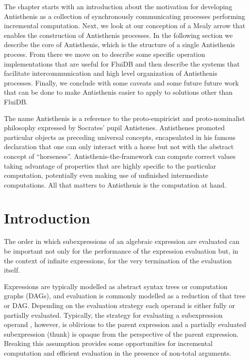 The chapter starts with an introduction about the motivation for
developing Antisthenis as a collection of synchronously communicating
processes performing incremental computation. Next, we look at our
conception of a Mealy arrow that enables the construction of
Antisthenis processes. In the following section we describe the core
of Antisthenis, which is the structure of a single Antisthenis
process. From there we move on to describe some specific operation
implementations that are useful for FluiDB and then describe the
systems that facilitate intercommunication and high level organization
of Antisthenis processes. Finally, we conclude with some caveats and
some future future work that can be done to make Antisthenis easier to
apply to solutions other than FluiDB.

The name Antisthenis is a reference to the proto-empiricist
and proto-nominalist philosophy expressed by Socrates'
pupil Antistenes. Antisthenes promoted particular objects as
preceding universal concepts, encapsulated in his famous
declaration that one can only interact with a horse but not
with the abstract concept of ``horseness''. Antisthenis-the-framework can
compute correct values taking advantage of properties
that are highly specific to the particular computation, potentially
even making use of unfinished intermediate computations.
All that matters to Antisthenis is the computation at hand.

\section{Introduction}
\label{sec:antisthenis_intro}

The order in which subexpressions of an algebraic expression are
evaluated can be important not only for the performance of the
expression evaluation but, in the context of infinite expressions, for
the very termination of the evaluation itself.

Expressions are typically modelled as abstract syntax trees or
computation graphs (DAGs), and evaluation is commonly modelled as a
reduction of that tree or DAG. Depending on the evaluation strategy
each operand is either fully or partially evaluated. Typically, the
strategy for evaluating a subexpression operand , however, is
oblivious to the parent expression and a partially evaluated
subexpression (thunk) is opaque from the perspective of the parent
expression. Breaking this assumption provides some opportunities for
incremental computation and efficient evaluation in the presence of
non-total arguments.

